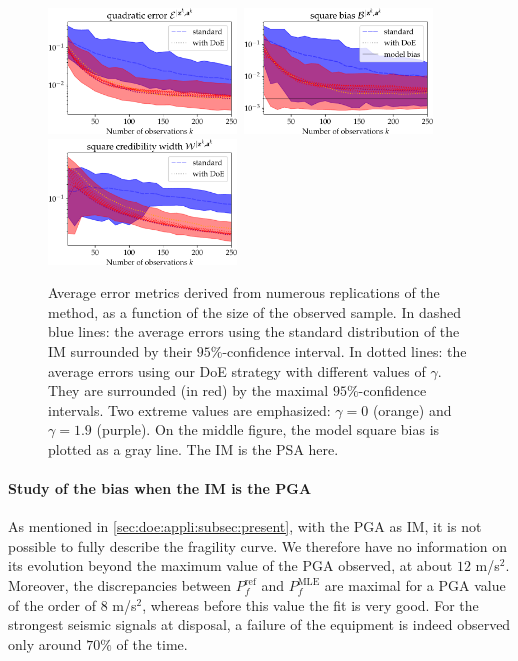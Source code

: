 \begin{figure}[h]
    \centering%
    \includegraphics[width=5cm]{figures/DoE/errE_PSA.pdf}\ \includegraphics[width=5cm]{figures/DoE/errB_PSA.pdf}\ \includegraphics[width=5cm]{figures/DoE/errW_PSA.pdf}%
    \caption{Average error metrics derived from numerous replications of the method, as a function of the size of the observed sample.
    In dashed blue lines: the average errors using the standard distribution of the IM surrounded by their $95\%$-confidence interval. In dotted lines: the average errors using our DoE strategy with different values of $\gamma$. They are surrounded (in red) by the maximal $95\%$-confidence intervals. Two extreme values are emphasized: $\gamma=0$ (orange) and $\gamma=1.9$ (purple).
    On the middle figure, the model square bias is plotted as a gray line.
     The IM  is the PSA here.}
    \label{fig:doe:errors-psa}
\end{figure}



\paragraph{Study of the bias when the IM is the PGA}
{As mentioned in \cref{sec:doe:appli:subsec:present}, with the PGA as IM, it is not possible to fully describe the fragility curve. We therefore have no information on its evolution beyond the maximum value of the PGA observed, at about $12$ m/s$^2$. Moreover, the discrepancies between $P_f^{\text{ref}}$ and $P_f^{\text{MLE}}$ are maximal for a PGA value of the order of $8$ m/s$^2$, whereas before this value the fit is very good.} For the strongest seismic signals at disposal, a failure of the equipment is indeed observed only around {$70\%$} of the time.

